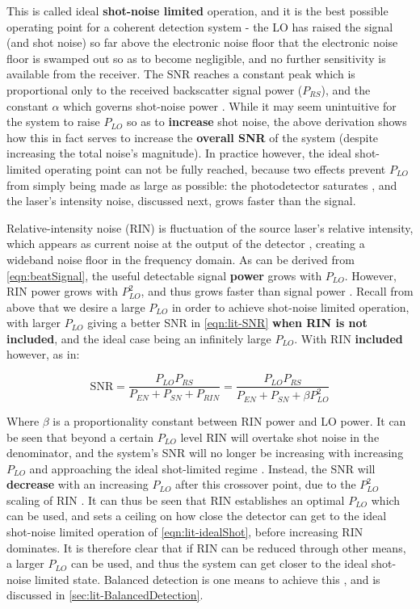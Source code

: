     This is called ideal \textbf{shot-noise limited} operation, and it is the best possible operating point for a coherent detection system - the LO has raised the signal (and shot noise) so far above the electronic noise
    floor that the electronic noise floor is swamped out so as to become negligible,
    and no further sensitivity is available from the receiver. The SNR reaches a constant peak which is proportional only to the received backscatter signal power ($P_{RS}$), and the constant $\alpha$ which governs shot-noise power 
    \cite{bennett_doppler_2003}. While it may seem unintuitive for the system to raise $P_{LO}$ so as to \textbf{increase} shot noise, the above derivation shows how this in fact serves to increase the \textbf{overall SNR} of the system (despite increasing the total noise's magnitude). In practice however, the ideal shot-limited operating point can not be fully reached, because two effects prevent $P_{LO}$ from simply being made as large as possible:
    the photodetector saturates \cite{abdelazim_development_2015}, and the
    laser's intensity noise, discussed next, grows faster than the signal.
    
    Relative-intensity noise (RIN) is fluctuation of the source laser's relative intensity, which appears as current noise at the output of the detector \cite{hill_remote_nodate}, creating a wideband noise floor in the frequency domain. As can be derived from \autoref{eqn:beatSignal}, the useful detectable signal \textbf{power} grows with $P_{LO}$. However, RIN power grows with $P_{LO}^2$, and thus grows faster than signal power \cite{abdelazim_development_2015}. Recall from above that we desire a large $P_{LO}$ in order to achieve shot-noise limited operation, with larger $P_{LO}$ giving a better SNR in \autoref{eqn:lit-SNR} \textbf{when RIN is not included}, and the ideal case being an infinitely large $P_{LO}$. With RIN \textbf{included} however, as in:

    \begin{equation}
        \mathrm{SNR}=\frac{P_{LO}P_{RS}}{P_{EN}+P_{SN}+P_{RIN}} = \frac{P_{LO}P_{RS}}{P_{EN}+P_{SN}+\beta P_{LO}^2}
    \end{equation}
    
    Where $\beta$ is a proportionality constant between RIN power and LO power. It can be seen that beyond a certain $P_{LO}$ level RIN will overtake shot noise in the denominator, and the system's SNR will no longer be increasing with increasing $P_{LO}$ and approaching the ideal shot-limited regime \cite{abdelazim_development_2015}. Instead, the SNR will \textbf{decrease} with an increasing $P_{LO}$ after this crossover point, due to the $P_{LO}^2$ scaling of RIN \cite{cariou2006laser}. It can thus be seen that RIN establishes an optimal $P_{LO}$ which can be used, and sets a ceiling on how close the detector can get to the ideal shot-noise limited operation of \autoref{eqn:lit-idealShot}, before increasing RIN dominates. It is therefore clear that if RIN can be reduced through other means, a larger $P_{LO}$ can be used, and thus the system can get closer to the ideal shot-noise limited state. Balanced detection is one means to achieve this \cite{cariou2006laser}, and is discussed in \autoref{sec:lit-BalancedDetection}.


